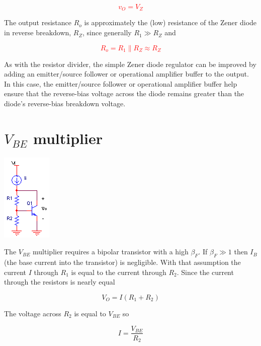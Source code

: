 \textcolor{red}{
\begin{equation}
v_{O} = V_{Z}
\end{equation}
}

The output resistance $R_{o}$ is approximately the (low) resistance of the Zener diode in reverse breakdown, $R_{Z}$, since generally $R_{1} \gg R_{Z}$ and

\textcolor{red}{
\begin{equation}
R_{o} = R_1 \parallel R_{Z} \approx R_{Z}
\end{equation}
}

As with the resistor divider, the simple Zener diode regulator can be improved by adding an emitter/source follower or operational amplifier buffer to the output.
In this case, the emitter/source follower or operational amplifier buffer help ensure that the reverse-bias voltage across the diode remains greater than the diode's reverse-bias breakdown voltage.

\section{$V_{BE}$ multiplier}
\begin{center}
	\includegraphics{schematics/vbe_multiplier.PNG}
\end{center}

The $V_{BE}$ multiplier requires a bipolar transistor with a high $\beta_{F}$.
If $\beta_{F} \gg 1$ then $I_{B}$ (the base current into the transistor) is negligible.
With that assumption the current $I$ through $R_1$ is equal to the current through $R_2$.
Since the current through the resistors is nearly equal

\begin{equation}
V_{O} = I(R_1 + R_2)
\end{equation}

The voltage across $R_2$ is equal to $V_{BE}$ so

\begin{equation}
I = \frac{V_{BE}}{R_2}
\end{equation}

